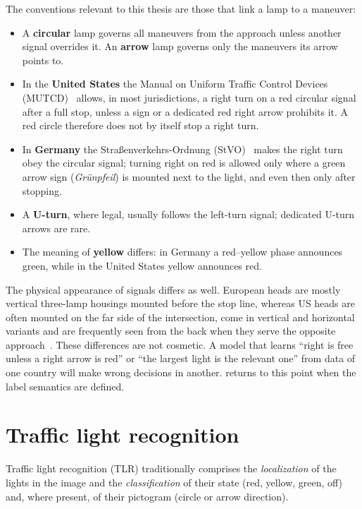 The conventions relevant to this thesis are those that link a lamp to a maneuver:
\begin{itemize}
  \item A \textbf{circular} lamp governs all maneuvers from the approach unless another signal
        overrides it. An \textbf{arrow} lamp governs only the maneuvers its arrow points to.
  \item In the \textbf{United States} the Manual on Uniform Traffic Control Devices
        (MUTCD)~\cite{fhwa2009mutcd} allows, in most jurisdictions, a right turn on a red circular
        signal after a full stop, unless a sign or a dedicated red right arrow prohibits it. A red
        circle therefore does not by itself stop a right turn.
  \item In \textbf{Germany} the Stra\ss enverkehrs-Ordnung (StVO)~\cite{stvo} makes the right turn
        obey the circular signal; turning right on red is allowed only where a green arrow sign
        (\emph{Gr\"unpfeil}) is mounted next to the light, and even then only after stopping.
  \item A \textbf{U-turn}, where legal, usually follows the left-turn signal; dedicated U-turn arrows
        are rare.
  \item The meaning of \textbf{yellow} differs: in Germany a red--yellow phase announces green, while in
        the United States yellow announces red.
\end{itemize}
The physical appearance of signals differs as well. European heads are mostly vertical three-lamp
housings mounted before the stop line, whereas US heads are often mounted on the far side of the
intersection, come in vertical and horizontal variants and are frequently seen from the back when
they serve the opposite approach~\cite{trinci2026color}. These differences are not cosmetic. A model
that learns ``right is free unless a right arrow is red'' or ``the largest light is the relevant one''
from data of one country will make wrong decisions in another.  returns to this point
when the label semantics are defined.

\section{Traffic light recognition}
\label{sec:bg-tlr}

Traffic light recognition (TLR) traditionally comprises the \emph{localization} of the lights in the
image and the \emph{classification} of their state (red, yellow, green, off) and, where present, of
their pictogram (circle or arrow direction).

